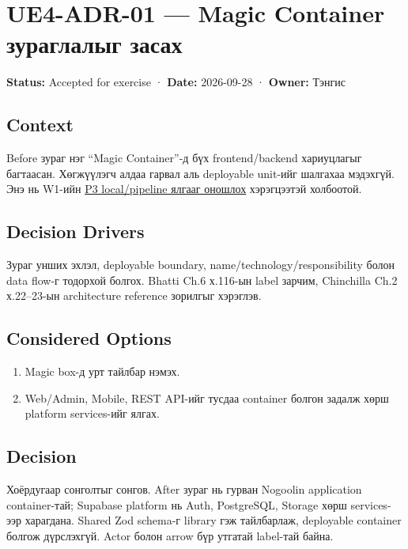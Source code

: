 \documentclass[
  mongolian,
]{article}
\providecommand{\tightlist}{%
  \setlength{\itemsep}{0pt}\setlength{\parskip}{0pt}}
\begin{document}
\newpage

\section{UE4-ADR-01 --- Magic Container зураглалыг
засах}\label{ue4-adr-01-magic-container-ux437ux443ux440ux430ux433ux43bux430ux43bux44bux433-ux437ux430ux441ux430ux445}

\textbf{Status:} Accepted for exercise · \textbf{Date:} 2026-09-28 ·
\textbf{Owner:} Тэнгис

\subsection{Context}\label{context-3}

Before зураг нэг ``Magic Container''-д бүх frontend/backend хариуцлагыг
багтаасан. Хөгжүүлэгч алдаа гарвал аль deployable unit-ийг шалгахаа
мэдэхгүй. Энэ нь W1-ийн
\href{https://github.com/Tengis01/Nogoolin/blob/main/docs/ICSI438/sem1/wiki/02_audience_persona.md}{P3
local/pipeline ялгааг оношлох} хэрэгцээтэй холбоотой.

\subsection{Decision Drivers}\label{decision-drivers-3}

Зураг унших эхлэл, deployable boundary, name/technology/responsibility
болон data flow-г тодорхой болгох. Bhatti Ch.6 х.116-ын label зарчим,
Chinchilla Ch.2 х.22--23-ын architecture reference зорилгыг хэрэглэв.

\subsection{Considered Options}\label{considered-options-3}

\begin{enumerate}
\def\labelenumi{\arabic{enumi}.}
\tightlist
\item
  Magic box-д урт тайлбар нэмэх.
\item
  Web/Admin, Mobile, REST API-ийг тусдаа container болгон задалж хөрш
  platform services-ийг ялгах.
\end{enumerate}

\subsection{Decision}\label{decision-3}

Хоёрдугаар сонголтыг сонгов. After зураг нь гурван Nogoolin application
container-тай; Supabase platform нь Auth, PostgreSQL, Storage хөрш
services-ээр харагдана. Shared Zod schema-г library гэж тайлбарлаж,
deployable container болгож дүрслэхгүй. Actor болон arrow бүр утгатай
label-тай байна.
\end{document}
